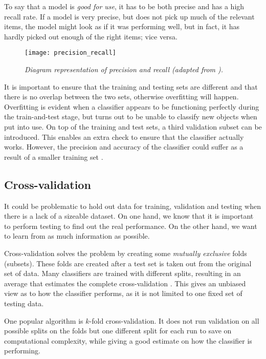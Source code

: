 To say that a model is \textit{good for use}, it has to be both precise and has a high recall rate. If a model is very precise, but does not pick up much of the relevant items, the model might look as if it was performing well, but in fact, it has hardly picked out enough of the right items; vice versa.

\begin{figure}[H]
  \centering
  \texttt{[image: precision\_recall]}
  \caption{\textit{ Diagram representation of precision and recall (adapted from \protect{}). }}
  \label{fig:precision_recall}
\end{figure}

It is important to ensure that the training and testing sets are different and that there is no overlap between the two sets, otherwise overfitting will happen. Overfitting is evident when a classifier appears to be functioning perfectly during the train-and-test stage, but turns out to be unable to classify new objects when put into use. On top of the training and test sets, a third validation subset can be introduced. This enables an extra check to ensure that the classifier actually works.  However, the precision and accuracy of the classifier could suffer as a result of a smaller training set \cite{scikit-learn-paper}. 

\subsection{Cross-validation}
It could be problematic to hold out data for training, validation and testing when there is a lack of a sizeable dataset. On one hand, we know that it is important to perform testing to find out the real performance. On the other hand, we want to learn from as much information as possible.

Cross-validation solves the problem by creating some \textit{mutually exclusive} folds (subsets). These folds are created after a test set is taken out from the original set of data. Many classifiers are trained with different splits, resulting in an average that estimates the complete cross-validation \cite{cross-val-kohavi}. This gives an unbiased view as to how the classifier performs, as it is not limited to one fixed set of testing data. 

One popular algorithm is $k$-fold cross-validation. It does not run validation on all possible splits on the folds but one different split for each run to save on computational complexity, while giving a good estimate on how the classifier is performing.


